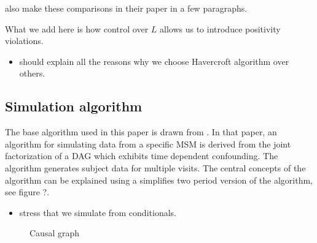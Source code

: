 \documentclass[11pt]{article}
\providecommand{\tightlist}{%
      \setlength{\itemsep}{0pt}\setlength{\parskip}{0pt}}
\begin{document}
\citet{Havercroft2012} also make these comparisons in their paper in a
few paragraphs.

What we add here is how control over \(L\) allows us to introduce
positivity violations.

\begin{itemize}
\tightlist
\item
  should explain all the reasons why we choose Havercroft algorithm over
  others.
\end{itemize}

    \subsection{Simulation algorithm}\label{simulation-algorithm}

The base algorithm used in this paper is drawn from
\citet{Havercroft2012}. In that paper, an algorithm for simulating data
from a specific MSM is derived from the joint factorization of a DAG
which exhibits time dependent confounding. The algorithm generates
subject data for multiple visits. The central concepts of the algorithm
can be explained using a simplifies two period version of the algorithm,
see figure ?. \linebreak

\begin{itemize}
\tightlist
\item
  stress that we simulate from conditionals.
\end{itemize}

    \begin{figure}
\centering
{}
\caption{Causal graph}
\end{figure}
\end{document}
